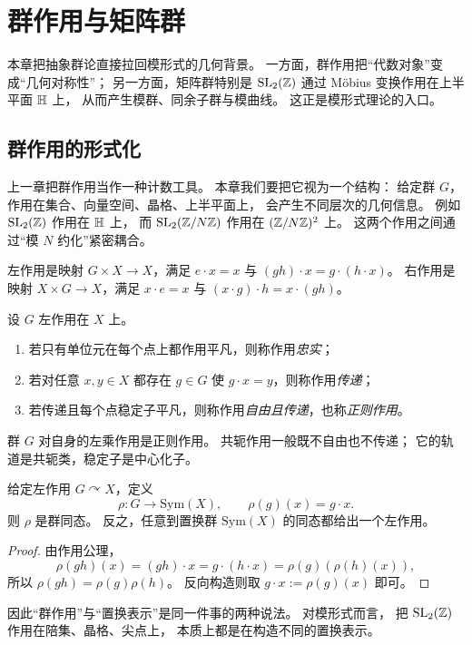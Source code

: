 \chapter{群作用与矩阵群}
本章把抽象群论直接拉回模形式的几何背景。
一方面，群作用把“代数对象”变成“几何对称性”；
另一方面，矩阵群特别是 $\mathrm{SL}_2(\mathbb{Z})$ 通过 Möbius 变换作用在上半平面 $\mathbb{H}$ 上，
从而产生模群、同余子群与模曲线。
这正是模形式理论的入口。
\section{群作用的形式化}
\begin{example}[为什么还要重新讲群作用]
上一章把群作用当作一种计数工具。
本章我们要把它视为一个结构：
给定群 $G$，作用在集合、向量空间、晶格、上半平面上，
会产生不同层次的几何信息。
例如 $\mathrm{SL}_2(\mathbb{Z})$ 作用在 $\mathbb{H}$ 上，
而 $\mathrm{SL}_2(\mathbb{Z}/N\mathbb{Z})$ 作用在 $(\mathbb{Z}/N\mathbb{Z})^2$ 上。
这两个作用之间通过“模 $N$ 约化”紧密耦合。
\end{example}
\begin{definition}
左作用是映射 $G\times X\to X$，满足 $e\cdot x=x$ 与 $(gh)\cdot x=g\cdot(h\cdot x)$。
右作用是映射 $X\times G\to X$，满足 $x\cdot e=x$ 与 $(x\cdot g)\cdot h=x\cdot(gh)$。
\end{definition}
\begin{definition}
设 $G$ 左作用在 $X$ 上。
\begin{enumerate}[label=\textnormal{(\arabic*)}, leftmargin=3em]
  \item 若只有单位元在每个点上都作用平凡，则称作用\emph{忠实}；
  \item 若对任意 $x,y\in X$ 都存在 $g\in G$ 使 $g\cdot x=y$，则称作用\emph{传递}；
  \item 若传递且每个点稳定子平凡，则称作用\emph{自由且传递}，也称\emph{正则作用}。
\end{enumerate}
\end{definition}
\begin{example}
群 $G$ 对自身的左乘作用是正则作用。
共轭作用一般既不自由也不传递；
它的轨道是共轭类，稳定子是中心化子。
\end{example}
\begin{proposition}
给定左作用 $G\curvearrowright X$，定义
\[
\rho:G\to \mathrm{Sym}(X),\qquad \rho(g)(x)=g\cdot x.
\]
则 $\rho$ 是群同态。
反之，任意到置换群 $\mathrm{Sym}(X)$ 的同态都给出一个左作用。
\end{proposition}
\begin{proof}
由作用公理，
\[
\rho(gh)(x)=(gh)\cdot x=g\cdot(h\cdot x)=\rho(g)(\rho(h)(x)),
\]
所以 $\rho(gh)=\rho(g)\rho(h)$。
反向构造则取 $g\cdot x:=\rho(g)(x)$ 即可。
\end{proof}
\begin{remark}
因此“群作用”与“置换表示”是同一件事的两种说法。
对模形式而言，
把 $\mathrm{SL}_2(\mathbb{Z})$ 作用在陪集、晶格、尖点上，
本质上都是在构造不同的置换表示。
\end{remark}
